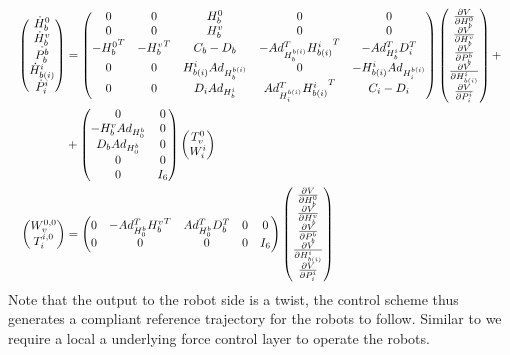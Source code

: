 \documentclass[a4paper,twoside, openright,12pt]{report}
\begin{document}
\begin{eqnarray}
\resizebox{1\hsize}{!}{$
\begin{aligned}
\begin{pmatrix}\dot{H}_b^0 \\ \dot{H}_b^v \\  \dot{P_b^b} \\ \dot{H}_{b(i)}^i \\ \dot{P}_i^i\end{pmatrix}
 &=
\begin{pmatrix} 0 & 0 & H_b^0 & 0 & 0\\ 0 & 0 & H_b^v & 0 & 0 \\
- {H_b^0}^T & -{H_b^v}^T & C_b-D_b & -Ad_{H_b^{b(i)}}^T {H_{b(i)}^i}^T & -Ad_{H_b^i}^T D_i^T \\
0 & 0 & H_{b(i)}^i Ad_{H_b^{b(i)}} & 0 & -H_{b(i)}^i Ad_{H_i^{b(i)}} \\ 0 & 0 & D_i Ad_{H_b^i} & Ad_{H_i^{b(i)}}^T {H_{b(i)}^i}^T & C_i - D_i\end{pmatrix}
\begin{pmatrix}\frac{\partial V}{\partial H_b^0}\\ \frac{\partial V}{\partial H_b^v} \\ \frac{\partial V}{\partial P_b^b} \\ \frac{\partial V}{\partial H_{b(i)}^i} \\ 
\frac{\partial V}{\partial P_{i}^i}\end{pmatrix} + \\
&+
\begin{pmatrix}
0 & 0 \\
-H_b^v Ad_{H_0^b} & 0 \\
D_b Ad_{H_0^b} & 0 \\
0 & 0 \\
0 & I_6
\end{pmatrix}
\begin{pmatrix}
T_v^0 \\ W_i^i
\end{pmatrix}
\\
\begin{pmatrix}
W_v^{0,0} \\ T_i^{i,0}
\end{pmatrix}
&=
\begin{pmatrix}
0 & -Ad_{H_0^b}^T  {H_b^v}^T & Ad_{H_0^b}^T D_b^T & 0 & 0 \\
0 & 0 & 0 & 0 & I_6
\end{pmatrix}
\begin{pmatrix}\frac{\partial V}{\partial H_b^0}\\ \frac{\partial V}{\partial H_b^v} \\ \frac{\partial V}{\partial P_b^b} \\ \frac{\partial V}{\partial H_{b(i)}^i} \\ 
\frac{\partial V}{\partial P_{i}^i}\end{pmatrix}
\end{aligned}
$}
\end{eqnarray}
Note that the output to the robot side is a twist, the control scheme thus generates a compliant reference trajectory for the robots to follow. Similar to \cite{Caccavale_08} we require a local a underlying force control layer to operate the robots.
\end{document}

